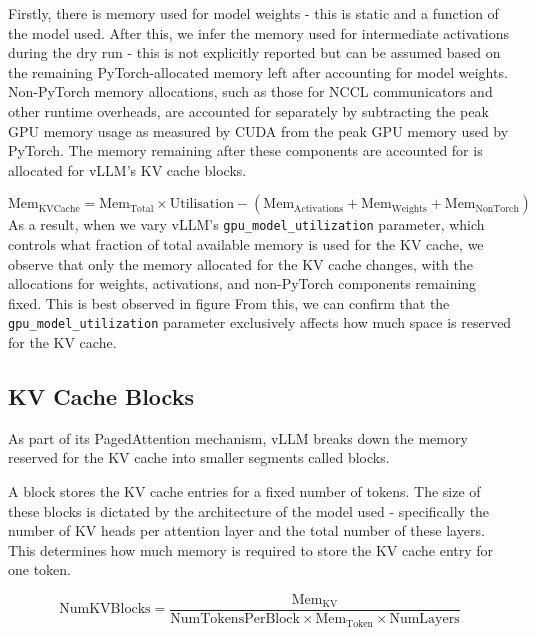\documentclass[12pt,twoside]{report}
\begin{document}
Firstly, there is memory used for model weights - this is static and a function of the model used.
After this, we infer the memory used for intermediate activations during the dry run - this is not explicitly reported but can be assumed based on the remaining PyTorch-allocated memory left after accounting for model weights.
Non-PyTorch memory allocations, such as those for NCCL communicators and other runtime overheads, are accounted for separately by subtracting the peak GPU memory usage as measured by CUDA from the peak GPU memory used by PyTorch.
The memory remaining after these components are accounted for is allocated for vLLM's KV cache blocks.

\begin{equation*}
  \text{Mem}_{\text{KVCache}} = \text{Mem}_{\text{Total}} \times \text{Utilisation} - (\text{Mem}_{\text{Activations}} + \text{Mem}_{\text{Weights}} + \text{Mem}_{\text{NonTorch}})
\end{equation*}
As a result, when we vary vLLM’s \texttt{gpu\_model\_utilization} parameter, which controls what fraction of total available memory is used for the KV cache, we observe that only the memory allocated for the KV cache changes, with the allocations for weights, activations, and non-PyTorch components remaining fixed.
This is best observed in figure %
From this, we can confirm that the \texttt{gpu\_model\_utilization} parameter exclusively affects how much space is reserved for the KV cache. %


\subsection{KV Cache Blocks}
As part of its PagedAttention mechanism, vLLM breaks down the memory reserved for the KV cache into smaller segments called blocks.

A block stores the KV cache entries for a fixed number of tokens.
The size of these blocks is dictated by the architecture of the model used - specifically the number of KV heads per attention layer and the total number of these layers.
This determines how much memory is required to store the KV cache entry for one token.

\begin{equation*}
  \text{NumKVBlocks} = \frac{\text{Mem}_{\text{KV}}}{\text{NumTokensPerBlock} \times \text{Mem}_{\text{Token}} \times \text{NumLayers}}
\end{equation*}
\end{document}
